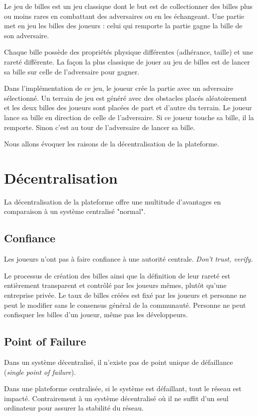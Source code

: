 \documentclass{article}
\begin{document}
Le jeu de billes est un jeu classique dont le but est de collectionner des billes plus ou moins rares en combattant des adversaires ou en les échangeant. Une partie met en jeu les billes des joueurs : celui qui remporte la partie gagne la bille de son adversaire.

Chaque bille possède des propriétés physique différentes (adhérance, taille) et une rareté différente.
La façon la plus classique de jouer au jeu de billes est de lancer sa bille sur celle de l'adversaire pour gagner.


Dans l'implémentation de ce jeu, le joueur crée la partie avec un adversaire sélectionné.
Un terrain de jeu est généré avec des obstacles placés aléatoirement et les deux billes des joueurs sont placées de part et d'autre du terrain. Le joueur lance sa bille en direction de celle de l'adversaire. Si ce joueur touche sa bille, il la remporte. Sinon c'est au tour de l'adversaire de lancer sa bille. 

Nous allons évoquer les raisons de la décentralisation de la plateforme.

\section{Décentralisation}
La décentralisation de la plateforme offre une multitude d'avantages en comparaison à un système centralisé "normal".

\subsection{Confiance}
Les joueurs n'ont pas à faire confiance à une autorité centrale. 
\textit{Don't trust, verify.}

Le processus de création des billes ainsi que la définition de leur rareté est entièrement transparent et contrôlé par les joueurs mêmes, plutôt qu'une entreprise privée. Le taux de billes créées est fixé par les joueurs et personne ne peut le modifier sans le consensus général de la communauté. Personne ne peut confisquer les billes d'un joueur, même pas les développeurs.

\subsection{Point of Failure}
Dans un système décentralisé, il n'existe pas de point unique de défaillance (\textit{single point of failure}). 

Dans une plateforme centralisée, si le système est défaillant, tout le réseau est impacté. Contrairement à un système décentralisé où il ne suffit d'un seul ordinateur pour assurer la stabilité du réseau.
\end{document}
